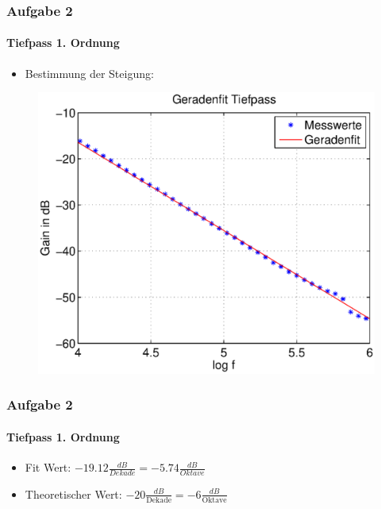 \begin{frame}
    \frametitle{Aufgabe 2}
    \framesubtitle{Tiefpass 1. Ordnung}
     \begin{itemize}
         \item Bestimmung der Steigung:
     \end{itemize}
     \begin{figure}[H]
     \begin{center}
             \includegraphics[scale=0.55]{./img/2a_Fit.eps}
     \end{center}
     \end{figure}
\end{frame}
\begin{frame}
    \frametitle{Aufgabe 2}
    \framesubtitle{Tiefpass 1. Ordnung}
     \begin{itemize}
        \item Fit Wert: $-19.12 \frac{dB}{Dekade}= -5.74 \frac{dB}{Oktave}$
        \item Theoretischer Wert:
        $-20\frac{dB}{\text{Dekade}}=-6\frac{dB}{\text{Oktave}}$
     \end{itemize}
\end{frame}
